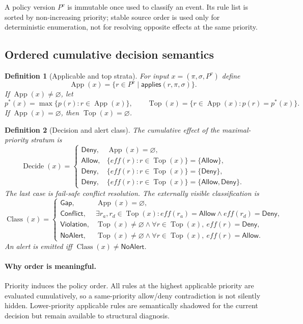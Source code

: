 \documentclass[11pt]{article}
\newtheorem{definition}{Definition}[section]
\theoremstyle{remark}
\newcommand{\Top}{\operatorname{Top}}
\newcommand{\App}{\operatorname{App}}
\newcommand{\Class}{\operatorname{Class}}
\newcommand{\Decide}{\operatorname{Decide}}
\newcommand{\NoAlert}{\mathsf{NoAlert}}
\newcommand{\Violation}{\mathsf{Violation}}
\newcommand{\Conflict}{\mathsf{Conflict}}
\newcommand{\Gap}{\mathsf{Gap}}
\newcommand{\Allow}{\mathsf{Allow}}
\newcommand{\Deny}{\mathsf{Deny}}
\begin{document}
A policy version $P^v$ is immutable once used to classify an event. Its rule list is sorted by non-increasing priority; stable source order is used only for deterministic enumeration, not for resolving opposite effects at the same priority.

\subsection{Ordered cumulative decision semantics}

\begin{definition}[Applicable and top strata]
For input $x=(\pi,\sigma,P^v)$ define
\[
\App(x)=\{r\in P^v\mid \mathsf{applies}(r,\pi,\sigma)\}.
\]
If $\App(x)\neq\varnothing$, let
\[
p^*(x)=\max\{p(r):r\in\App(x)\},\qquad
\Top(x)=\{r\in\App(x):p(r)=p^*(x)\}.
\]
If $\App(x)=\varnothing$, then $\Top(x)=\varnothing$.
\end{definition}

\begin{definition}[Decision and alert class]
The cumulative effect of the maximal-priority stratum is
\[
\Decide(x)=
\begin{cases}
\Deny, & \App(x)=\varnothing,\\
\Allow, & \{eff(r):r\in\Top(x)\}=\{\Allow\},\\
\Deny, & \{eff(r):r\in\Top(x)\}=\{\Deny\},\\
\Deny, & \{eff(r):r\in\Top(x)\}=\{\Allow,\Deny\}.
\end{cases}
\]
The last case is fail-safe conflict resolution. The externally visible classification is
\[
\Class(x)=
\begin{cases}
\Gap, & \App(x)=\varnothing,\\
\Conflict, & \exists r_a,r_d\in\Top(x): eff(r_a)=\Allow\land eff(r_d)=\Deny,\\
\Violation, & \Top(x)\neq\varnothing\land \forall r\in\Top(x),\ eff(r)=\Deny,\\
\NoAlert, & \Top(x)\neq\varnothing\land \forall r\in\Top(x),\ eff(r)=\Allow.
\end{cases}
\]
An alert is emitted iff $\Class(x)\neq\NoAlert$.
\end{definition}

\paragraph{Why order is meaningful.}
Priority induces the policy order. All rules at the highest applicable priority are evaluated cumulatively, so a same-priority allow/deny contradiction is not silently hidden. Lower-priority applicable rules are semantically shadowed for the current decision but remain available to structural diagnosis.
\end{document}
